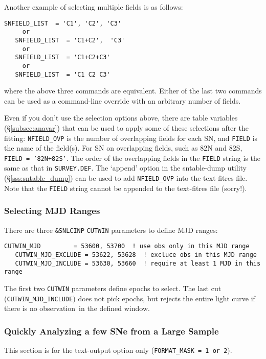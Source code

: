 \documentclass[12pt]{article}
\newcommand{\obs}{observation}
\begin{document}
Another example of selecting multiple fields is as follows:
%
\begin{Verbatim}[frame=single]
   SNFIELD_LIST  = 'C1', 'C2', 'C3'
     or
   SNFIELD_LIST  = 'C1+C2',  'C3'
     or
   SNFIELD_LIST  = 'C1+C2+C3'
     or
   SNFIELD_LIST  = 'C1 C2 C3'
\end{Verbatim}
where the above three commands are equivalent.
Either of the last two commands can be used as a 
command-line override with an arbitrary number of fields.


Even if you don't use the selection options above,
there are table variables (\S\ref{subsec:anavar})
that can be used to apply some of these selections 
after the fitting:
{\tt NFIELD\_OVP} is the number of overlapping fields
for each SN, and {\tt FIELD} is the name of the field(s).
For SN on overlapping fields, such as 82N and 82S, 
{\tt FIELD = '82N+82S'}. The order of the overlapping fields 
in the {\tt FIELD} string is the same as that in {\tt SURVEY.DEF}.
The `append' option in the sntable-dump utility
(\S\ref{sss:sntable_dump}) can be used to add
{\tt NFIELD\_OVP} into the text-fitres file.
Note that the {\tt FIELD} string cannot be appended to the
text-fitres file (sorry!).
 
\subsubsection{Selecting MJD Ranges}

There are three {\tt \&SNLCINP} {\tt CUTWIN} parameters to define
MJD ranges:
\begin{Verbatim}[frame=single]
   CUTWIN_MJD         = 53600, 53700  ! use obs only in this MJD range
   CUTWIN_MJD_EXCLUDE = 53622, 53628  ! excluce obs in this MJD range
   CUTWIN_MJD_INCLUDE = 53630, 53660  ! require at least 1 MJD in this range
\end{Verbatim}
The first two {\tt CUTWIN} parameters define epochs to select.
The last cut ({\tt CUTWIN\_MJD\_INCLUDE}) does not pick epochs,
but rejects the entire light curve if there is no \obs\ in the
defined window.

   \subsubsection{Quickly Analyzing a few SNe from a Large Sample}
   \label{subsec:quickAnal}

This section is for the text-output option only
({\tt FORMAT\_MASK = 1 or 2}).
\end{document}
